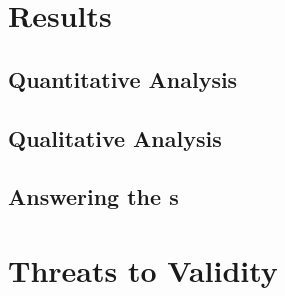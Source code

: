 \section{Results}
\label{sec:Results}

\subsection{Quantitative Analysis}

\subsection{Qualitative Analysis}

\subsection{Answering the s}

\section{Threats to Validity}
\label{sec:Threads-to-Validity}


\endinput

Any text after an \endinput is ignored.
You could put scraps here or things in progress.